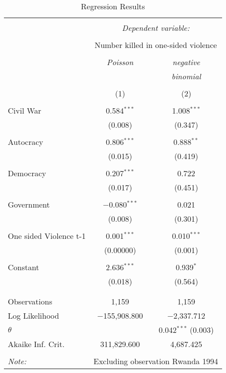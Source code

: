 
\begin{table}[H] \centering 
  \caption{Regression Results} 
  \label{} 
\begin{tabular}{@{\extracolsep{5pt}}lcc} 
\\[-1.8ex]\hline 
\hline \\[-1.8ex] 
 & \multicolumn{2}{c}{\textit{Dependent variable:}} \\ 
\cline{2-3} 
\\[-1.8ex] & \multicolumn{2}{c}{Number killed in one-sided violence} \\ 
\\[-1.8ex] & \textit{Poisson} & \textit{negative} \\ 
 & \textit{} & \textit{binomial} \\ 
\\[-1.8ex] & (1) & (2)\\ 
\hline \\[-1.8ex] 
 Civil War & 0.584$^{***}$ & 1.008$^{***}$ \\ 
  & (0.008) & (0.347) \\ 
  & & \\ 
 Autocracy & 0.806$^{***}$ & 0.888$^{**}$ \\ 
  & (0.015) & (0.419) \\ 
  & & \\ 
 Democracy & 0.207$^{***}$ & 0.722 \\ 
  & (0.017) & (0.451) \\ 
  & & \\ 
 Government & $-$0.080$^{***}$ & 0.021 \\ 
  & (0.008) & (0.301) \\ 
  & & \\ 
 One sided Violence t-1 & 0.001$^{***}$ & 0.010$^{***}$ \\ 
  & (0.00000) & (0.001) \\ 
  & & \\ 
 Constant & 2.636$^{***}$ & 0.939$^{*}$ \\ 
  & (0.018) & (0.564) \\ 
  & & \\ 
\hline \\[-1.8ex] 
Observations & 1,159 & 1,159 \\ 
Log Likelihood & $-$155,908.800 & $-$2,337.712 \\ 
$\theta$ &  & 0.042$^{***}$  (0.003) \\ 
Akaike Inf. Crit. & 311,829.600 & 4,687.425 \\ 
\hline 
\hline \\[-1.8ex] 
\textit{Note:}  & \multicolumn{2}{r}{Excluding observation Rwanda 1994} \\ 
\end{tabular} 
\end{table} 
